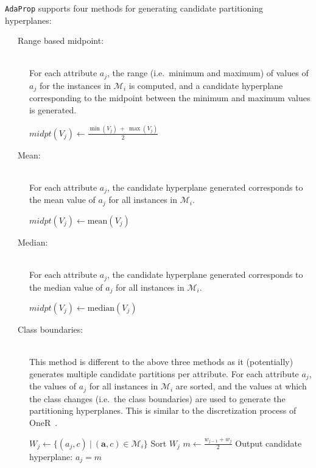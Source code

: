 \documentclass[a4paper,12pt]{article} %
\newcommand{\AdaProp}{\texttt{AdaProp}\xspace}
\newcommand{\mcl}[1]{\mathcal{#1}}
\newcommand{\vect}[1]{\boldsymbol{#1}}
\begin{document}
\AdaProp supports four methods for generating candidate partitioning hyperplanes:
\begin{description}

\item[~~~Range based midpoint:] \ \\
    For each attribute $a_j$, 
    the range (i.e.\ minimum and maximum) of 
        values of $a_j$ 
        for the instances in $\mcl{M}_i$ is computed, 
        and a candidate hyperplane corresponding to the midpoint between the 
        minimum and maximum values is generated.
    \begin{algorithmic}
        \State $midpt(V_j) \gets \frac{\min(V_j) ~+~ \max(V_j)}{2}$
    \end{algorithmic}
    
\item[~~~Mean:]  \ \\
    For each attribute $a_j$, 
        the candidate hyperplane generated corresponds to 
        the mean value of $a_j$ 
        for all instances in $\mcl{M}_i$.
    \begin{algorithmic}
        \State $midpt(V_j) \gets \textrm{mean}(V_j)$
    \end{algorithmic}    

\item[~~~Median:]  \ \\
    For each attribute $a_j$, 
        the candidate hyperplane generated corresponds to 
        the median value of $a_j$ 
        for all instances in $\mcl{M}_i$.
    \begin{algorithmic}
        \State $midpt(V_j) \gets \textrm{median}(V_j)$
    \end{algorithmic}  
    
\item[~~~Class boundaries:]  \ \\
    This method is different to the above three methods
        as it (potentially) generates multiple candidate partitions 
        per attribute.
    For each attribute $a_j$, 
        the values of $a_j$ for all instances in $\mcl{M}_i$ are sorted,
        and the values at which the class changes (i.e.\ the class boundaries)
        are used to generate the partitioning hyperplanes.
    This is similar to the discretization process of OneR~\cite{holte}.
    \begin{algorithmic}
        \State $W_j \gets \{ (a_j,c) ~\big|~ (\vect{a},c) \in \mcl{M}_i \}$
        \State Sort $W_j$
            \State $m \gets \frac{w_{j-1}+w_j}{2}$
            \State Output candidate hyperplane: $a_j = m$
        \EndFor
    \EndFor
    \end{algorithmic}
\end{description}
\end{document}
